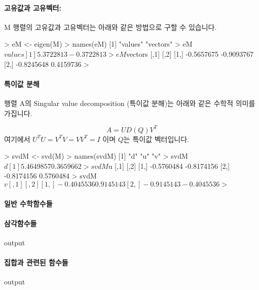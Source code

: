 \documentclass[../tutorial.tex]{subfiles}
\begin{document}
\paragraph{고유값과 고유벡터:}  M 행렬의 고유값과 고유벡터는 아래와 같은 방법으로 구할 수 있습니다. 

\begin{Schunk}
\begin{Soutput}
> eM <- eigen(M)
> names(eM)
[1] "values"  "vectors"
> eM$values
[1]  5.3722813 -0.3722813
> eM$vectors
           [,1]       [,2]
[1,] -0.5657675 -0.9093767
[2,] -0.8245648  0.4159736
> 
\end{Soutput}
\end{Schunk}

\paragraph{특이값 분해}

행렬 A의 Singular value decomposition (특이값 분해)는 아래와 같은 수학적 의미를 가집니다. 

\begin{equation}
A = U D(Q) V^T
\end{equation}
%
여기에서 $ U^T U = V^T V = VV^T = I $ 이며 $Q$는 특이값 벡터입니다. 

\begin{Schunk}
\begin{Soutput}
> svdM <- svd(M)
> names(svdM)
[1] "d" "u" "v"
> svdM$d
[1] 5.4649857 0.3659662
> svdM$u
           [,1]       [,2]
[1,] -0.5760484 -0.8174156
[2,] -0.8174156  0.5760484
> svdM$v
           [,1]       [,2]
[1,] -0.4045536  0.9145143
[2,] -0.9145143 -0.4045536
> $
\end{Soutput}
\end{Schunk}


\paragraph{일반 수학함수들}

\paragraph{삼각함수들}
\begin{Schunk}
\begin{Soutput}
output
\end{Soutput}
\end{Schunk}
\paragraph{집합과 관련된 함수들}
\begin{Schunk}
\begin{Soutput}
output
\end{Soutput}
\end{Schunk}
\end{document}
